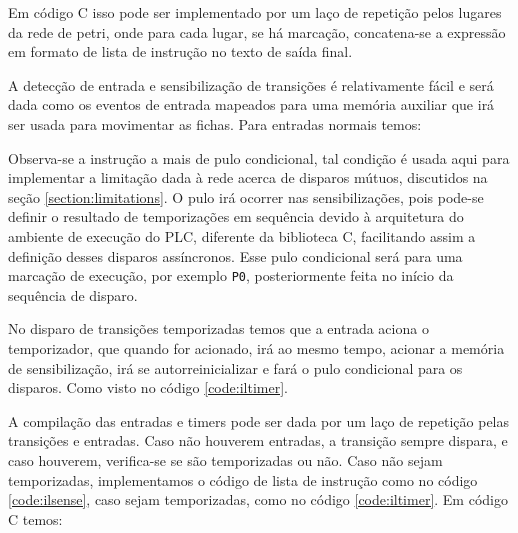 

Em código C isso pode ser implementado por um laço de repetição pelos lugares da rede de petri, onde para cada lugar, se há marcação, concatena-se a expressão em formato de lista de instrução no texto de saída final. 



A detecção de entrada e sensibilização de transições é relativamente fácil e será dada como os eventos de entrada mapeados para uma memória auxiliar que irá ser usada para movimentar as fichas. Para entradas normais temos:



Observa-se a instrução a mais de pulo condicional, tal condição é usada aqui para implementar a limitação dada à rede acerca de disparos mútuos, discutidos na seção \ref{section:limitations}. O pulo irá ocorrer nas sensibilizações, pois pode-se definir o resultado de temporizações em sequência devido à arquitetura do ambiente de execução do PLC, diferente da biblioteca C, facilitando assim a definição desses disparos assíncronos. Esse pulo condicional será para uma marcação de execução, por exemplo \lstinline{P0}, posteriormente feita no início da sequência de disparo.  



No disparo de transições temporizadas temos que a entrada aciona o temporizador, que quando for acionado, irá ao mesmo tempo, acionar a memória de sensibilização, irá se autorreinicializar e fará o pulo condicional para os disparos. Como visto no código \ref{code:iltimer}.

A compilação das entradas e timers pode ser dada por um laço de repetição pelas transições e entradas. Caso não houverem entradas, a transição sempre dispara, e caso houverem, verifica-se se são temporizadas ou não. Caso não sejam temporizadas, implementamos o código de lista de instrução como no código \ref{code:ilsense}, caso sejam temporizadas, como no código \ref{code:iltimer}. Em código C temos: 

